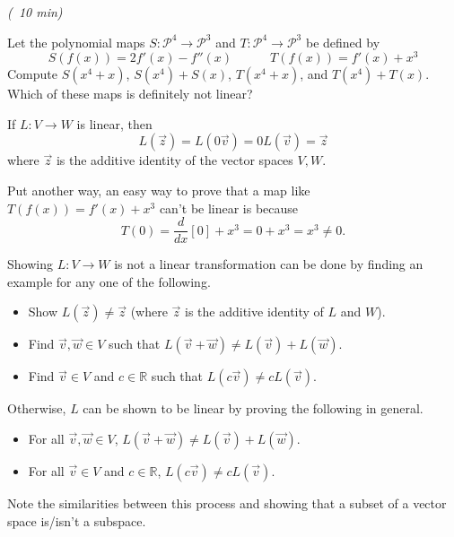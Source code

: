 \documentclass[10pt,]{book}
\theoremstyle{ptxplainnotitle}
\theoremstyle{ptxplaintitle}
\theoremstyle{ptxdefinitionnotitle}
\theoremstyle{ptxdefinitiontitle}
\theoremstyle{ptxdefinitionnotitle}
\theoremstyle{ptxdefinitiontitle}
\theoremstyle{ptxdefinitionnotitle}
\theoremstyle{ptxdefinitiontitle}
\theoremstyle{ptxdefinitionnotitle}
\theoremstyle{ptxdefinitiontitle}
\newcommand{\IR}{\mathbb{R}}
\newcommand{\Poly}{\mathcal{P}}
\begin{document}
\begin{activity}\label{activity-2}
\hypertarget{p-20}{}%
\emph{(~10 min)}%
\par
\hypertarget{p-21}{}%
Let the polynomial maps \(S: \Poly^4 \rightarrow \Poly^3\) and \(T: \Poly^4 \rightarrow \Poly^3\) be defined by%
%
\begin{equation*}
S(f(x)) = 2f'(x)-f''(x) \hspace{3em} T(f(x)) = f'(x)+x^3
\end{equation*}
\hypertarget{p-22}{}%
Compute \(S(x^4+x)\), \(S(x^4)+S(x)\), \(T(x^4+x)\), and \(T(x^4)+T(x)\). Which of these maps is definitely not linear?%
\end{activity}
\begin{fact}\label{fact-2}
\hypertarget{p-23}{}%
If \(L:V\to W\) is linear, then%
\begin{equation*}
L(\vec z)=L(0\vec v)=0L(\vec v)=\vec z
\end{equation*}
where \(\vec z\) is the additive identity of the vector spaces \(V,W\).%
\par
\hypertarget{p-24}{}%
Put another way, an easy way to prove that a map like \(T(f(x)) = f'(x)+x^3\) can't be linear is because%
\begin{equation*}
T(0)=\frac{d}{dx}[0]+x^3=0+x^3=x^3\not=0.
\end{equation*}
%
\end{fact}
\begin{note}\label{note-1}
\hypertarget{p-25}{}%
Showing \(L:V\to W\) is not a linear transformation can be done by finding an example for any one of the following.%
\leavevmode%
\begin{itemize}[label=\textbullet]
\item{}Show \(L(\vec z)\not=\vec z\) (where \(\vec z\) is the additive identity of \(L\) and \(W\)).%
\item{}Find \(\vec v,\vec w\in V\) such that \(L(\vec v+\vec w)\not=L(\vec v)+L(\vec w)\).%
\item{}Find \(\vec v\in V\) and \(c\in \IR\) such that \(L(c\vec v)\not=cL(\vec v)\).%
\end{itemize}
\hypertarget{p-26}{}%
Otherwise, \(L\) can be shown to be linear by proving the following in general.%
\leavevmode%
\begin{itemize}[label=\textbullet]
\item{}For all \(\vec v,\vec w\in V\), \(L(\vec v+\vec w)\not=L(\vec v)+L(\vec w)\).%
\item{}For all \(\vec v\in V\) and \(c\in \IR\), \(L(c\vec v)\not=cL(\vec v)\).%
\end{itemize}
\hypertarget{p-27}{}%
Note the similarities between this process and showing that a subset of a vector space is/isn't a subspace.%
\end{note}
\end{document}
